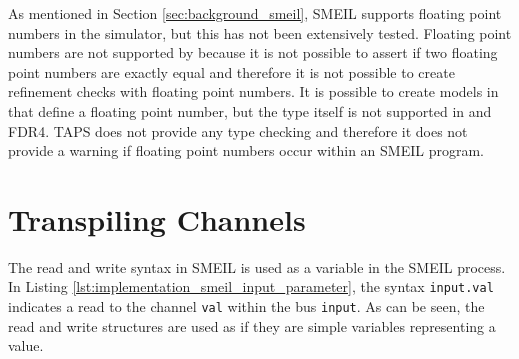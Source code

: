 As mentioned in Section \ref{sec:background_smeil}, SMEIL supports floating point numbers in the simulator, but this has not been extensively tested. Floating point numbers are not supported by \cspm{} because it is not possible to assert if two floating point numbers are exactly equal and therefore it is not possible to create refinement checks with floating point numbers. It is possible to create models in \cspm{} that define a floating point number, but the type itself is not supported in \cspm{} and FDR4. TAPS does not provide any type checking and therefore it does not provide a warning if floating point numbers occur within an SMEIL program.
\section{Transpiling Channels}
 The read and write syntax in SMEIL is used as a variable in the SMEIL process. In Listing \ref{lst:implementation_smeil_input_parameter}, the syntax \texttt{input.val} indicates a read to the channel \texttt{val} within the bus \texttt{input}. As can be seen, the read and write structures are used as if they are simple variables representing a value.

